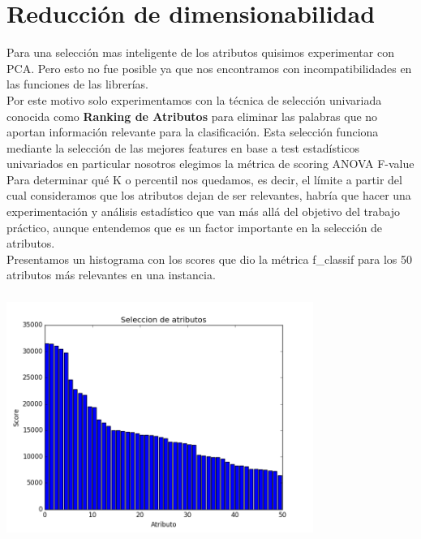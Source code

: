 \section{Reducción de dimensionabilidad}


Para una selección mas inteligente de los atributos quisimos experimentar con PCA. Pero 
esto no fue posible ya que nos encontramos con incompatibilidades en las funciones de las librerías. \\

Por este motivo solo experimentamos con la técnica de selección univariada conocida como 
\textbf{Ranking de Atributos} para eliminar las palabras que no aportan información relevante para la clasificación. Esta selección funciona mediante la selección de las mejores features en base a test estadísticos univariados en particular nosotros elegimos 
la métrica de scoring ANOVA F-value \\

Para determinar qué K o percentil nos quedamos, es decir, el límite a partir del cual consideramos que los atributos dejan de ser relevantes, habría que hacer una experimentación y análisis estadístico que van más allá del objetivo del trabajo práctico, aunque entendemos que es un factor importante en la selección de atributos. \\

Presentamos un histograma con los scores que dio la métrica f\_classif para los 50 atributos más relevantes en una instancia. 

\begin{center}
\includegraphics[height=8cm, width=10cm]{Seleccion_atributos.png}
\end{center}